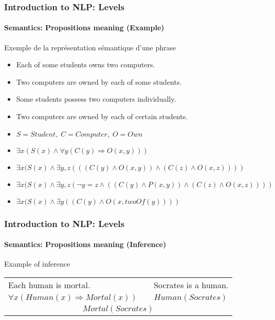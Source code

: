 \documentclass[xcolor=table]{beamer}
\begin{document}
\begin{frame}
\frametitle{Introduction to NLP: Levels}
\framesubtitle{Semantics: Propositions meaning (Example)}

\begin{exampleblock}{Exemple de la représentation sémantique d'une phrase}
	\begin{itemize}
		\item Each of some students owns two computers.
		\item Two computers are owned by each of some students.
		\item Some students possess two computers individually.
		\item Two computers are owned by each of certain students.
		\item $S = Student, \; C = Computer, \; O = Own$
		\item $\exists x (S(x) \wedge \forall y ( C(y) \Rightarrow O(x, y)) )$ \textcolor{red}{\XBox}
		\item $\exists x (S(x) \wedge \exists y, z (( (C(y) \wedge O(x, y) ) \wedge (C(z) \wedge O(x, z) ) ))$ \textcolor{red}{\XBox}
		\item $\exists x (S(x) \wedge \exists y, z (\neg y = z \wedge ( (C(y) \wedge P(x, y) ) \wedge (C(z) \wedge O(x, z) ) ))$ \textcolor{green}{\CheckedBox}
		\item $\exists x (S(x) \wedge \exists y ((C(y) \wedge O(x, twoOf(y)) ))$ \textcolor{green}{\CheckedBox}
	\end{itemize}
\end{exampleblock}

\end{frame}

\begin{frame}
\frametitle{Introduction to NLP: Levels}
\framesubtitle{Semantics: Propositions meaning (Inference)}

\begin{exampleblock}{Example of inference}
	\centering
	\begin{tabular}{lll}
		Each human is mortal.  & & Socrates is a human. \\
		$\forall x (Human(x) \Rightarrow Mortal(x))$ && $Human(Socrates)$ \\
		\hline
		\multicolumn{3}{c}{$Mortal(Socrates)$}\\
	\end{tabular}
	
\end{exampleblock}

\end{frame}
\end{document}

